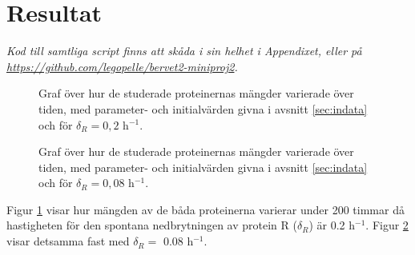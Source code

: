 \section{Resultat}
\label{sec:resultat}

\emph{Kod till samtliga script finns att skåda i sin helhet i Appendixet, eller på \url{https://github.com/legopelle/bervet2-miniproj2}.}

\begin{figure}[H]
	\centering
	
	\caption{Graf över hur de studerade proteinernas mängder varierade över tiden, med parameter- och initialvärden givna i avsnitt \ref{sec:indata} och för $\delta_R = 0,2$ h$^{-1}$.}
	\label{fig:GenOsc}
\end{figure}

\begin{figure}[H]
	\centering
	
	\caption{Graf över hur de studerade proteinernas mängder varierade över tiden, med parameter- och initialvärden givna i avsnitt \ref{sec:indata} och för $\delta_R = 0,08$ h$^{-1}$.}
	\label{fig:GenOsc008}
\end{figure}

Figur \ref{fig:GenOsc} visar hur mängden av de båda proteinerna varierar under 200 timmar då hastigheten för den spontana nedbrytningen av protein R ($\delta_R$) är 0.2 h$^{-1}$. Figur \ref{fig:GenOsc008} visar detsamma fast med $\delta_R =$ 0.08 h$^{-1}$.
